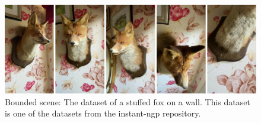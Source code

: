 \begin{figure}[h]
    \label{fig:fox-dataset}
    \centering
    \includegraphics[width=1.0\textwidth]{figures/fox-dataset.png}
    \caption{Bounded scene: The dataset of a stuffed fox on a wall. This dataset is one of the datasets from the instant-ngp repository.}
    \label{fig:my_label}
\end{figure}